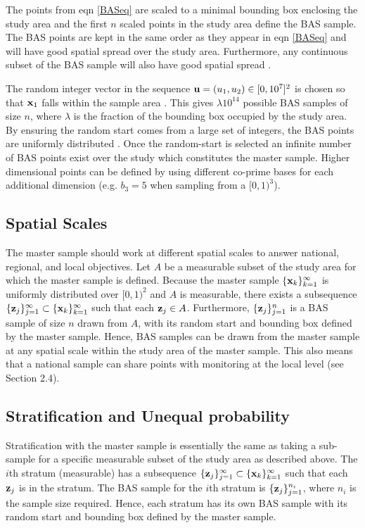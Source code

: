 \documentclass[titlepage]{article}
\begin{document}
The points from eqn \ref{BASeq} are scaled to a minimal bounding box enclosing the study area and the first $n$ scaled points in the study area define the BAS sample. The BAS points are kept in the same order as they appear in eqn \ref{BASeq} and will have good spatial spread over the study area. Furthermore, any continuous subset of the BAS sample will also have good spatial spread \citep{Robertson2017}.

The random integer vector in the sequence ${\bf u} = (u_1, u_2) \in [0,10^7]^2$ is chosen so that ${\bf x}_1$ falls within the sample area \citep{Robertson2017}. This gives $\lambda 10^{14}$ possible BAS samples of size $n$, where $\lambda$ is the fraction of the bounding box occupied by the study area. By ensuring the random start comes from a large set of integers, the BAS points are uniformly distributed \citep{Robertson2013}. Once the random-start is selected an infinite number of BAS points exist over the study which constitutes the master sample. Higher dimensional points can be defined by using different co-prime bases for each additional dimension (e.g. $b_3 = 5$ when sampling from a $[0,1)^3$).

\subsection{Spatial Scales}
The master sample should work at different spatial scales to answer national, regional, and local objectives. Let $A$ be a measurable subset of the study area for which the master sample is defined. Because the master sample $\{{\bf x}_k\}_{k=1}^{\infty}$ is uniformly distributed over $[0,1)^2$ \citep{Wang2000} and $A$ is measurable, there exists a subsequence $\{{\bf z}_j\}_{j=1}^{\infty} \subset \{{\bf x}_k\}_{k=1}^{\infty}$ such that each ${\bf z}_j \in A$. Furthermore, $\{{\bf z}_j\}_{j=1}^n$ is a BAS sample of size $n$ drawn from $A$, with its random start and bounding box defined by the master sample. Hence, BAS samples can be drawn from the master sample at any spatial scale within the study area of the master sample. This also means that a national sample can share points with monitoring at the local level (see Section 2.4).

\subsection{Stratification and Unequal probability}
Stratification with the master sample is essentially the same as taking a sub-sample for a specific measurable subset of the study area as described above. The $i$th stratum (measurable) has a subsequence $\{{\bf z}_j\}_{j=1}^{\infty} \subset \{{\bf x}_k\}_{k=1}^{\infty}$ such that each ${\bf z}_j$ is in the stratum. The BAS sample for the $i$th stratum is $\{{\bf z}_j\}_{j=1}^{n_i}$, where $n_i$ is the sample size required. Hence, each stratum has its own BAS sample with its random start and bounding box defined by the master sample.
\end{document}
